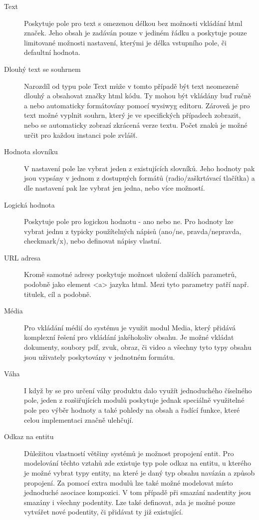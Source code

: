 \begin{description}
  \item[Text] Poskytuje pole pro text s omezenou délkou bez možnosti vkládání html značek. Jeho obsah je zadáván pouze v jediném řádku a poskytuje pouze limitované možnosti nastavení, kterými je délka vstupního pole, či defaultní hodnota. 
  
  \item[Dlouhý text se souhrnem] Narozdíl od typu pole Text může v tomto případě být text neomezeně dlouhý a obsahovat značky html kódu. Ty mohou být vkládány buď ručně a nebo automaticky formátovány pomocí \gls{wysiwyg} editoru. Zároveň je pro text možné vyplnit souhrn, který je ve specifických případech zobrazit, nebo se automaticky zobrazí zkrácená verze textu. Počet znaků je možné určit pro každou instanci pole zvlášť.
  
  \item[Hodnota slovníku] V nastavení pole lze vybrat jeden z existujících slovníků. Jeho hodnoty pak jsou vypsány v jednom z dostupných formátů (radio/zaškrtávací tlačítka) a dle nastavení pak lze vybrat jen jedna, nebo více možností.
  
  \item[Logická hodnota] Poskytuje pole pro logickou hodnotu - ano nebo ne. Pro hodnoty lze vybrat jednu z typicky použítelných nápisů (ano/ne, pravda/nepravda, checkmark/x), nebo definovat nápisy vlastní. 

  \item[URL adresa] Kromě samotné adresy poskytuje možnost uložení dalších parametrů, podobně jako element <a> jazyka html. Mezi tyto parametry patří např. titulek, cíl a podobně.

  \item[Média] Pro vkládání médií do systému je využit modul Media, který přidává komplexní řešení pro vkládání jakéhokoliv obsahu. Je možné vkládat dokumenty, soubory pdf, zvuk, obraz, či video a všechny tyto typy obsahu jsou uživately poskytovány v jednotném formátu.
  
  \item[Váha] I když by se pro určení váhy produktu dalo využít jednoduchého číselného pole, jeden z rozšiřujících modulů poskytuje jednak speciálně využitelné pole pro výběr hodnoty a také pohledy na obsah a řadící funkce, které celou implementaci značně ulehčují.
  
  \item[Odkaz na entitu] Důležitou vlastností většiny systémů je možnost propojení entit. Pro modelování těchto vztahů zde existuje typ pole odkaz na entitu, u kterého je možné vybrat typy entity, na které je daný typ obsahu navázán a způsob propojení. Za pomocí extra modulů lze také možné modelovat místo jednoduché asociace kompozici. V tom případě při smazání nadentity jsou smazány i všechny podentity. Lze také definovat, zda je možné pouze vytvářet nové podentity, či přidávat ty již existující.
\end{description}
